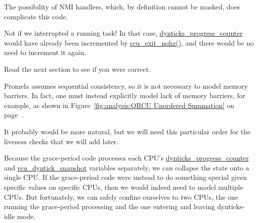 	The possibility of NMI handlers, which, by definition cannot
	be masked, does complicate this code.


	Not if we interrupted a running task!
	In that case, \url{dynticks_progress_counter} would
	have already been incremented by \url{rcu_exit_nohz()},
	and there would be no need to increment it again.


	Read the next section to see if you were correct.


	Promela assumes sequential consistency, so
	it is not necessary to model memory barriers.
	In fact, one must instead explicitly model lack of memory barriers,
	for example, as shown in
	Figure~\ref{fig:analysis:QRCU Unordered Summation} on
	page~\pageref{fig:analysis:QRCU Unordered Summation}.


	It probably would be more natural, but we will need
	this particular order for the liveness checks that we will add later.


	Because the grace-period code processes each
	CPU's \url{dynticks_progress_counter} and
	\url{rcu_dyntick_snapshot} variables separately,
	we can collapse the state onto a single CPU.
	If the grace-period code were instead to do something special
	given specific values on specific CPUs, then we would indeed need
	to model multiple CPUs.
	But fortunately, we can safely confine ourselves to two CPUs, the
	one running the grace-period processing and the one entering and
	leaving dynticks-idle mode.


